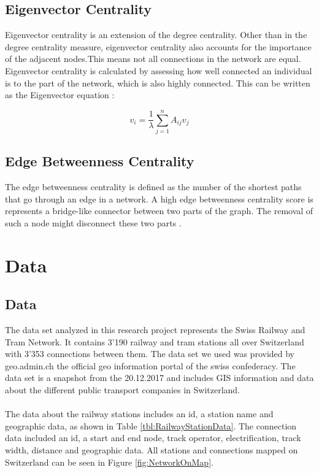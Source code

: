 \documentclass{Resources/netsci-project}
\begin{document}
\subsection{Eigenvector Centrality}
Eigenvector centrality is an extension of the degree centrality. Other than in the degree centrality measure, eigenvector centrality also accounts for the importance of the adjacent nodes.This means not all connections in the network are equal. Eigenvector centrality is calculated by assessing how well connected an individual is to the part of the network, which is also highly connected. This can be written as the Eigenvector equation \autocite{GraphSwiss}:

\begin{equation} \label{eqRestMass}
    v_{i}= \frac{1}{\lambda}\sum_{j = 1}^{n}A_{ij}v_{j}
\end{equation}

\subsection{Edge Betweenness Centrality}
The edge betweenness centrality is defined as the number of the shortest paths that go through an edge in a network. A high edge betweenness centrality score is represents a bridge-like connector between two parts of the graph. The removal of such a node might disconnect these two parts \autocite{Betweenness}.

\section{Data}
\subsection{Data}
The data set analyzed in this research project represents the Swiss Railway and Tram Network. It contains 3’190 railway and tram stations all over Switzerland with 3'353 connections between them. The data set we used was provided by geo.admin.ch the official geo information portal of the swiss confederacy. The data set is a snapshot from the 20.12.2017 and includes GIS information and data about the different public transport companies in Switzerland. \autocite{Dataset}
\\~\\
The data about the railway stations includes an id, a station name and geographic data, as shown in Table \ref{tbl:RailwayStationData}. The connection data included an id, a start and end node, track operator, electrification, track width, distance and geographic data. All stations and connections mapped on Switzerland can be seen in Figure \ref{fig:NetworkOnMap}.
\end{document}
